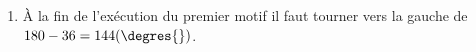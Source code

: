 
\begin{enumerate}[resume]
\item %
À la fin de l'exécution du premier motif il faut tourner vers la gauche de $180 - 36 = 144(\degres{})$.

\begin{center}
\begin{scratch}
{
}
\end{scratch}

\end{center}\end{enumerate}
